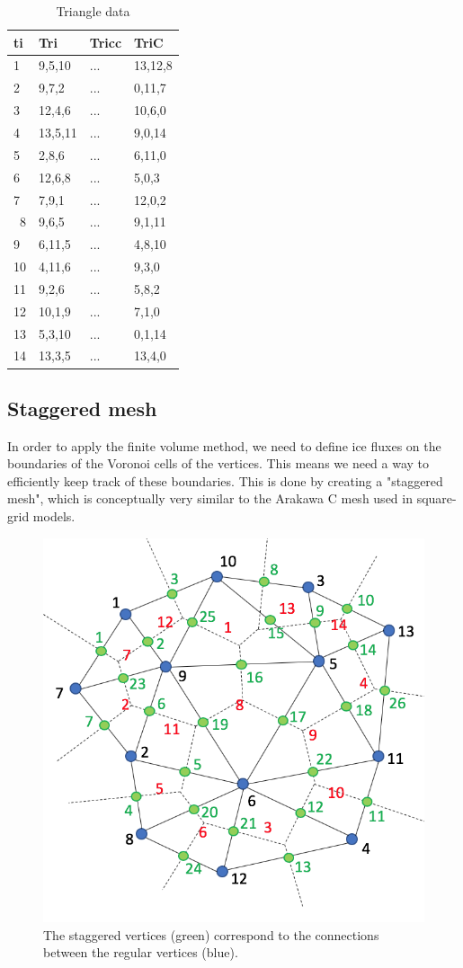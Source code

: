\documentclass{article}
\begin{document}
\begin{table}[H] \label{tab:table_triangledata_01}
  \begin{center}
    \caption{Triangle data}
    \begin{tabular}{l|l|l|l}
      \textbf{ti} & \textbf{Tri} & \textbf{Tricc} & \textbf{TriC}\\
      \hline
      1 & 9,5,10 & ... & 13,12,8\\
      2 & 9,7,2 & ... & 0,11,7\\
      3 & 12,4,6 & ... & 10,6,0\\
      4 & 13,5,11 & ... & 9,0,14\\
      5 & 2,8,6 & ... & 6,11,0\\
      6 & 12,6,8 & ... & 5,0,3\\
      7 & 7,9,1 & ... & 12,0,2\\\
      8 & 9,6,5 & ... & 9,1,11\\
      9 & 6,11,5 & ... & 4,8,10\\
      10 & 4,11,6 & ... & 9,3,0\\
      11 & 9,2,6 & ... & 5,8,2\\
      12 & 10,1,9 & ... & 7,1,0\\
      13 & 5,3,10 & ... & 0,1,14\\
      14 & 13,3,5 & ... & 13,4,0\\
    \end{tabular}
  \end{center}
\end{table}


\newpage
\subsection{Staggered mesh}

In order to apply the finite volume method, we need to define ice fluxes on the boundaries of the Voronoi cells of the vertices. This means we need a way to efficiently keep track of these boundaries. This is done by creating a "staggered mesh", which is conceptually very similar to the Arakawa C mesh used in square-grid models.

\begin{figure}[H] \label{fig:staggeredmesh}
  \includegraphics[width=0.5\linewidth]{Fig_staggeredmesh.png}
  \caption{The staggered vertices (green) correspond to the connections between the regular vertices (blue).}
\end{figure}
\end{document}
